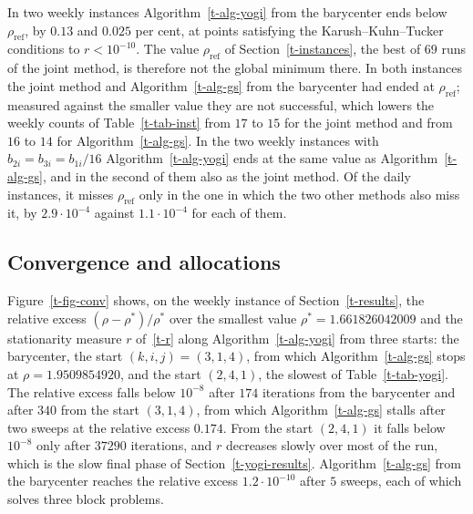 \documentclass[11pt]{article}
\theoremstyle{plain}
\theoremstyle{remark}
\numberwithin{equation}{section}
\begin{document}
In two weekly instances Algorithm~\ref{t-alg-yogi} from the barycenter ends
below $\rho_{\mathrm{ref}}$, by $0.13$ and $0.025$ per cent, at points
satisfying the Karush--Kuhn--Tucker conditions to $r<10^{-10}$. The value
$\rho_{\mathrm{ref}}$ of Section~\ref{t-instances}, the best of $69$ runs of
the joint method, is therefore not the global minimum there. In both instances
the joint method and Algorithm~\ref{t-alg-gs} from the barycenter had ended at
$\rho_{\mathrm{ref}}$; measured against the smaller value they are not
successful, which lowers the weekly counts of Table~\ref{t-tab-inst} from $17$
to $15$ for the joint method and from $16$ to $14$ for
Algorithm~\ref{t-alg-gs}. In the two weekly instances with
$b_{2i}=b_{3i}=b_{1i}/16$ Algorithm~\ref{t-alg-yogi} ends at the same value as
Algorithm~\ref{t-alg-gs}, and in the second of them also as the joint method.
Of the daily instances, it misses $\rho_{\mathrm{ref}}$ only in the one in which
the two other methods also miss it, by $2.9\cdot 10^{-4}$ against
$1.1\cdot 10^{-4}$ for each of them.

\subsection{Convergence and allocations}\label{t-yogi-figures}

Figure~\ref{t-fig-conv} shows, on the weekly instance of
Section~\ref{t-results}, the relative excess $(\rho-\rho^*)/\rho^*$ over the
smallest value $\rho^*=1.661826042009$ and the stationarity measure $r$
of~\eqref{t-r} along Algorithm~\ref{t-alg-yogi} from three starts: the
barycenter, the start $(k,i,j)=(3,1,4)$, from which Algorithm~\ref{t-alg-gs}
stops at $\rho=1.9509854920$, and the start $(2,4,1)$, the slowest of
Table~\ref{t-tab-yogi}. The relative excess falls below $10^{-8}$ after $174$
iterations from the barycenter and after $340$ from the start $(3,1,4)$, from
which Algorithm~\ref{t-alg-gs} stalls after two sweeps at the relative excess
$0.174$. From the start $(2,4,1)$ it falls below $10^{-8}$ only after $37290$
iterations, and $r$ decreases slowly over most of the run, which is the slow
final phase of Section~\ref{t-yogi-results}. Algorithm~\ref{t-alg-gs} from
the barycenter reaches the relative excess $1.2\cdot 10^{-10}$ after $5$
sweeps, each of which solves three block problems.
\end{document}
